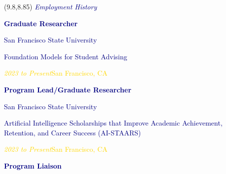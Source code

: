\documentclass[hidelinks, 10pt]{article}
\begin{document}
\begin{textblock}{4}(9.8,8.85)
    \setlength{\parindent}{0cm}
    \large{\textcolor{navy}{\textit{Employment History}}}

    \vspace{1mm}

    \footnotesize\textcolor{navy}{\scriptsize\textbf{Graduate Researcher}}

    \vspace{0.5mm}

    \footnotesize\textcolor{navy}{\scriptsize San Francisco State University}

    \vspace{0.5mm}

    \scriptsize\textcolor{navy}{\scriptsize Foundation Models for Student Advising}

    \vspace{0.5mm}

    \scriptsize\textcolor{gold}{\scriptsize\emph{2023 to Present}\hfill San
        Francisco, CA}

    \vspace{1mm}

    \footnotesize\textcolor{navy}{\scriptsize\textbf{Program Lead/Graduate Researcher}}

    \vspace{0.5mm}

    \footnotesize\textcolor{navy}{\scriptsize San Francisco State University}

    \vspace{0.5mm}

    \scriptsize\textcolor{navy}{\scriptsize Artificial Intelligence Scholarships that Improve Academic Achievement, Retention, and Career Success (AI-STAARS)}

    \vspace{0.5mm}

    \scriptsize\textcolor{gold}{\scriptsize\emph{2023 to Present}\hfill San
        Francisco, CA}

    \vspace{1mm}

    \footnotesize\textcolor{navy}{\scriptsize\textbf{Program Liaison}}

    \vspace{0.5mm}


\end{textblock}
\end{document}
